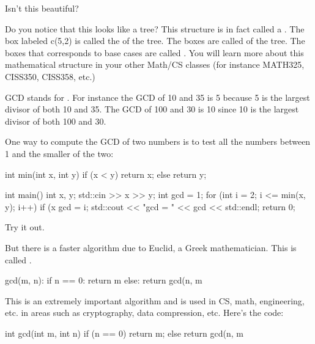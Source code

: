 Isn't this beautiful?

Do you notice that this looks like a tree? This structure is in fact
called a . The box labeled c(5,2) is called the
 of the tree. The boxes are called 
of the tree. The boxes that corresponds to base cases are called
. You will learn more about this
mathematical structure in your other Math/CS classes (for instance
MATH325, CISS350, CISS358, etc.)





\newpage{}

GCD stands for . For instance the GCD of
10 and 35 is 5 because 5 is the largest divisor of both 10 and 35. The
GCD of 100 and 30 is 10 since 10 is the largest divisor of both 100 and
30.

One way to compute the GCD of two numbers is to test all the numbers
between 1 and the smaller of the two:

\begin{consolethree}[escapeinside=||]
int min(int x, int y)
{
    if (x < y)
        return x;
    else
        return y;
}

int main()
{
    int x, y;
    std::cin >> x >> y;
    int gcd = 1;
    for (int i = 2; i <= min(x, y); i++)
    {
        if (x %
        {
            gcd = i;
        }
    }
    std::cout << "gcd = " << gcd << std::endl;
    return 0;
}
\end{consolethree}

Try it out.

But there is a faster algorithm due to Euclid, a Greek mathematician.
This is called .

\begin{consolethree}
gcd(m, n):
    if n == 0:
        return m
    else:
        return gcd(n, m %
\end{consolethree}

This is an extremely important algorithm and is used in CS, math,
engineering, etc. in areas such as cryptography, data compression, etc.
Here's the code:

\begin{consolethree}[escapeinside=||]
int gcd(int m, int n)
{
    if (n == 0)
        return m;
    else
        return gcd(n, m %
}
\end{consolethree}

